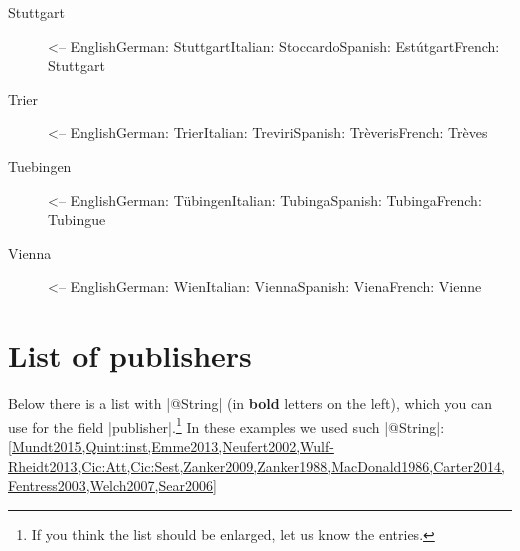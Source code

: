 \documentclass[a4paper,
10pt,
greek,
french,
spanish,
italian,
ngerman,
english
]{ltxdoc}
\begin{document}
\begin{multicols}{3}
\begin{description}
\item[Stuttgart] <-- English\newline German: Stuttgart\newline Italian: Stoccardo\newline Spanish: Estútgart\newline French: Stuttgart
\item[Trier] <-- English\newline German: Trier\newline Italian: Treviri\newline Spanish: Trèveris\newline French: Trèves
\item[Tuebingen] <-- English\newline German: Tübingen\newline Italian: Tubinga\newline Spanish: Tubinga\newline French: Tubingue
\item[Vienna] <-- English\newline German: Wien\newline Italian: Vienna\newline Spanish: Viena\newline French: Vienne

\end{description}
\end{multicols}
\section{List of publishers}\label{list-publishers}
Below there is a list with |@String| (in \textbf{bold} letters on the left), which you can use for the field |publisher|.\footnote{If you think the list should be enlarged, let us know the entries.}
In these examples we used such |@String|:
\cref{Mundt2015,Quint:inst,Emme2013,Neufert2002,Wulf-Rheidt2013,Cic:Att,Cic:Sest,Zanker2009,Zanker1988,MacDonald1986,Carter2014,Fentress2003,Welch2007,Sear2006}
\end{document}

